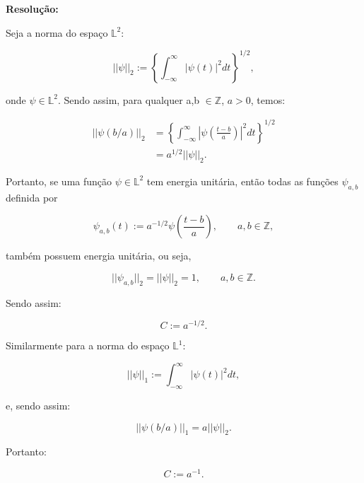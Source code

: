 \textbf{Resolução:}

Seja a norma do espaço $\mathbb{L}^2$:

\begin{equation*}
||\psi||_{2} := \left\{\int_{-\infty}^{\infty} |\psi(t)|^{2}dt\right\}^{1/2},
\end{equation*}

onde $\psi \in \mathbb{L}^{2}$. Sendo assim, para qualquer a,b $\in \mathbb{Z}$, $a>0$, temos:

\begin{align*}
||\psi(b/a)||_{2} &= \left\{\int_{-\infty}^{\infty} |\psi\left(\frac{t-b}{a}\right)|^{2}dt\right\}^{1/2} \\
 &= a^{1/2} ||\psi||_{2}.
\end{align*}

Portanto, se uma função $\psi \in \mathbb{L}^{2}$ tem energia unitária, então todas as funções $\psi_{a,b}$ definida por

\begin{equation*}
\psi_{a,b}(t) := a^{-1/2}\psi\left(\frac{t-b}{a}\right), \qquad a,b \in \mathbb{Z},
\end{equation*}

também possuem energia unitária, ou seja,

\begin{equation*}
||\psi_{a,b}||_{2} = ||\psi||_{2}=1, \qquad a,b \in \mathbb{Z}.
\end{equation*}

Sendo assim: 

\begin{equation*}
C := a^{-1/2}.  \tag*{$\blacksquare$}
\end{equation*}

Similarmente para a norma do espaço $\mathbb{L}^{1}$:

\begin{equation*}
||\psi||_{1} := \int_{-\infty}^{\infty} |\psi(t)|^{2}dt,
\end{equation*}

e, sendo assim:

\begin{equation*}
||\psi(b/a)||_{1} = a ||\psi||_{2}.
\end{equation*}

Portanto:

\begin{equation*}
C := a^{-1}.  \tag*{$\blacksquare$}
\end{equation*}





























